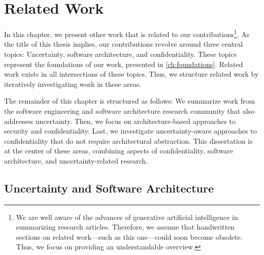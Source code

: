 \chapter{Related Work}%
\label{ch:relatedwork}%
 

In this chapter, we present other work that is related to our contributions\footnote{We are well aware of the advances of generative artificial intelligence in summarizing research articles. Therefore, we assume that handwritten sections on related work---such as this one---could soon become obsolete. Thus, we focus on providing an understandable overview.}.
As the title of this thesis implies, our contributions revolve around three central topics: Uncertainty, software architecture, and confidentiality.
These topics represent the foundations of our work, presented in \autoref{ch:foundations}.
Related work exists in all intersections of these topics.
Thus, we structure related work by iteratively investigating work in these areas.

The remainder of this chapter is structured as follows:
We summarize work from the software engineering and software architecture research community that also addresses uncertainty.
Then, we focus on architecture-based approaches to security and confidentiality.
Last, we investigate uncertainty-aware approaches to confidentiality that do not require architectural abstraction.
This dissertation is at the center of these areas, combining aspects of confidentiality, software architecture, and uncertainty-related research.






\section{Uncertainty and Software Architecture}%
\label{sec:relatedwork:uncertaintyXarchitecture}

